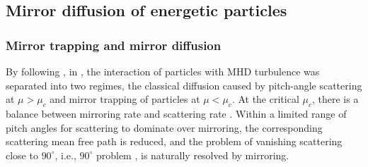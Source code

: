 \documentclass[preprint2,twocolumn,times,tighten]{aastex63}
\begin{document}

\subsection{Mirror diffusion of energetic particles}

\subsubsection{Mirror trapping and mirror diffusion}

{By following \citet{CesK73}}, 
in \citet{XL20}, the interaction of particles with MHD turbulence was 
separated into two regimes, {the classical diffusion caused by pitch-angle scattering} at $\mu>\mu_{c}$ and mirror trapping of particles at $\mu<\mu_{c}$. 
At the critical $\mu_c$, there is a balance between mirroring rate and scattering rate
\citep{XL20,LXm21}. 
{Within a limited range of pitch angles for scattering to dominate over mirroring, 
the corresponding scattering mean free path is reduced, and the problem of vanishing scattering close to $90^\circ$, i.e., $90^\circ$ problem
\citep{Jokipii1966}, 
is naturally resolved by mirroring. }
\end{document}
